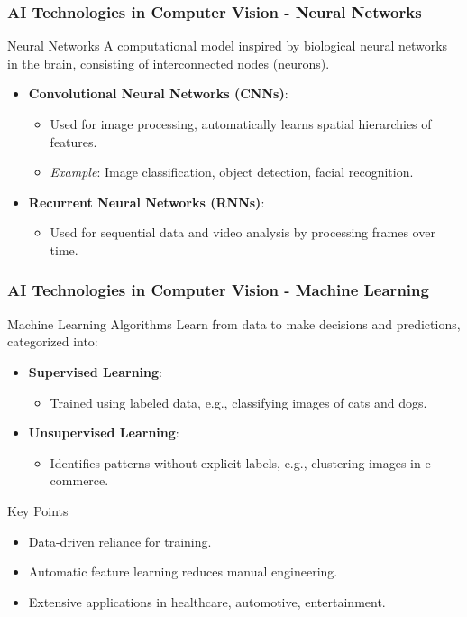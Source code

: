 \documentclass[aspectratio=169]{beamer}
\begin{document}
\begin{frame}[fragile]
    \frametitle{AI Technologies in Computer Vision - Neural Networks}
    \begin{block}{Neural Networks}
        A computational model inspired by biological neural networks in the brain, consisting of interconnected nodes (neurons).
    \end{block}
    \begin{itemize}
        \item \textbf{Convolutional Neural Networks (CNNs)}:
        \begin{itemize}
            \item Used for image processing, automatically learns spatial hierarchies of features.
            \item \textit{Example}: Image classification, object detection, facial recognition.
        \end{itemize}
        \item \textbf{Recurrent Neural Networks (RNNs)}:
        \begin{itemize}
            \item Used for sequential data and video analysis by processing frames over time.
        \end{itemize}
    \end{itemize}
\end{frame}

\begin{frame}[fragile]
    \frametitle{AI Technologies in Computer Vision - Machine Learning}
    \begin{block}{Machine Learning Algorithms}
        Learn from data to make decisions and predictions, categorized into:
    \end{block}
    \begin{itemize}
        \item \textbf{Supervised Learning}:
        \begin{itemize}
            \item Trained using labeled data, e.g., classifying images of cats and dogs.
        \end{itemize}
        \item \textbf{Unsupervised Learning}:
        \begin{itemize}
            \item Identifies patterns without explicit labels, e.g., clustering images in e-commerce.
        \end{itemize}
    \end{itemize}
    \begin{block}{Key Points}
        \begin{itemize}
            \item Data-driven reliance for training.
            \item Automatic feature learning reduces manual engineering.
            \item Extensive applications in healthcare, automotive, entertainment.
        \end{itemize}
    \end{block}
\end{frame}
\end{document}
